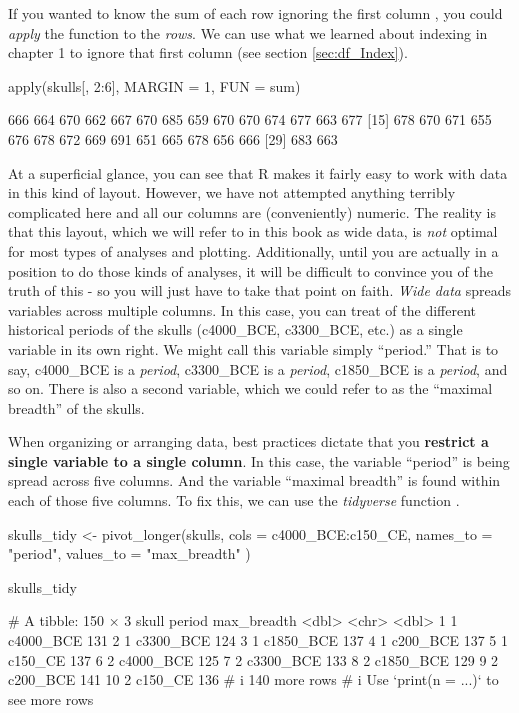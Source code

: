 If you wanted to know the sum of each row ignoring the first column , you could \textit{apply} the  function to the \textit{rows}. We can use what we learned about indexing in chapter 1 to ignore that first column (see section \ref{sec:df_Index}).

\begin{inR}
apply(skulls[, 2:6], MARGIN = 1, FUN = sum)
\end{inR}

\begin{outR}
 [1] 666 664 670 662 667 670 685 659 670 670 674 677 663 677
[15] 678 670 671 655 676 678 672 669 691 651 665 678 656 666
[29] 683 663
\end{outR}

At a superficial glance, you can see that R makes it fairly easy to work with data in this kind of layout. However, we have not attempted anything terribly complicated here and all our columns are (conveniently) numeric. The reality is that this layout, which we will refer to in this book as \gls{wide data}, is \textit{not} optimal for most types of analyses and plotting. Additionally, until you are actually in a position to do those kinds of analyses, it will be difficult to convince you of the truth of this - so you will just have to take that point on faith. \textit{Wide data} spreads variables across multiple columns. In this case, you can treat of the different historical periods of the skulls (c4000\_BCE, c3300\_BCE, etc.) as a single variable in its own right. We might call this variable simply ``period.'' That is to say, c4000\_BCE is a \textit{period}, c3300\_BCE is a \textit{period}, c1850\_BCE is a \textit{period}, and so on. There is also a second variable, which we could refer to as the ``maximal breadth'' of the skulls.

When organizing or arranging data, best practices dictate that you \textbf{restrict a single variable to a single column}. In this case, the variable ``period'' is being spread across five columns. And the variable ``maximal breadth'' is found within each of those five columns. To fix this, we can use the \textit{tidyverse} function .

\begin{inR}
skulls_tidy <- pivot_longer(skulls,
  cols = c4000_BCE:c150_CE,
  names_to = "period",
  values_to = "max_breadth"
)

skulls_tidy
\end{inR}
\begin{outR}
# A tibble: 150 × 3
   skull period    max_breadth
   <dbl> <chr>           <dbl>
 1     1 c4000_BCE         131
 2     1 c3300_BCE         124
 3     1 c1850_BCE         137
 4     1 c200_BCE          137
 5     1 c150_CE           137
 6     2 c4000_BCE         125
 7     2 c3300_BCE         133
 8     2 c1850_BCE         129
 9     2 c200_BCE          141
10     2 c150_CE           136
# i 140 more rows
# i Use `print(n = ...)` to see more rows
\end{outR}

